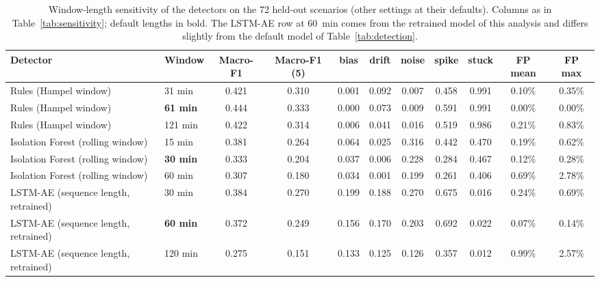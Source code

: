 \begin{table}[!ht]
\centering
\footnotesize
\caption{Window-length sensitivity of the detectors on the 72 held-out scenarios (other settings at their defaults). Columns as in Table~\ref{tab:sensitivity}; default lengths in bold. The LSTM-AE row at 60~min comes from the retrained model of this analysis and differs slightly from the default model of Table~\ref{tab:detection}.}
\label{tab:windowlength}
\setlength{\tabcolsep}{4pt}
\begin{tabular}{llccccccccc}
\toprule
\textbf{Detector} & \textbf{Window} & \textbf{Macro-F1} & \textbf{Macro-F1 (5)} & \textbf{bias} & \textbf{drift} & \textbf{noise} & \textbf{spike} & \textbf{stuck} & \textbf{FP mean} & \textbf{FP max} \\
\midrule
Rules (Hampel window) & 31 min & 0.421 & 0.310 & 0.001 & 0.092 & 0.007 & 0.458 & 0.991 & 0.10\% & 0.35\% \\
Rules (Hampel window) & \textbf{61 min} & 0.444 & 0.333 & 0.000 & 0.073 & 0.009 & 0.591 & 0.991 & 0.00\% & 0.00\% \\
Rules (Hampel window) & 121 min & 0.422 & 0.314 & 0.006 & 0.041 & 0.016 & 0.519 & 0.986 & 0.21\% & 0.83\% \\
\midrule
Isolation Forest (rolling window) & 15 min & 0.381 & 0.264 & 0.064 & 0.025 & 0.316 & 0.442 & 0.470 & 0.19\% & 0.62\% \\
Isolation Forest (rolling window) & \textbf{30 min} & 0.333 & 0.204 & 0.037 & 0.006 & 0.228 & 0.284 & 0.467 & 0.12\% & 0.28\% \\
Isolation Forest (rolling window) & 60 min & 0.307 & 0.180 & 0.034 & 0.001 & 0.199 & 0.261 & 0.406 & 0.69\% & 2.78\% \\
\midrule
LSTM-AE (sequence length, retrained) & 30 min & 0.384 & 0.270 & 0.199 & 0.188 & 0.270 & 0.675 & 0.016 & 0.24\% & 0.69\% \\
LSTM-AE (sequence length, retrained) & \textbf{60 min} & 0.372 & 0.249 & 0.156 & 0.170 & 0.203 & 0.692 & 0.022 & 0.07\% & 0.14\% \\
LSTM-AE (sequence length, retrained) & 120 min & 0.275 & 0.151 & 0.133 & 0.125 & 0.126 & 0.357 & 0.012 & 0.99\% & 2.57\% \\
\bottomrule
\end{tabular}
\end{table}
